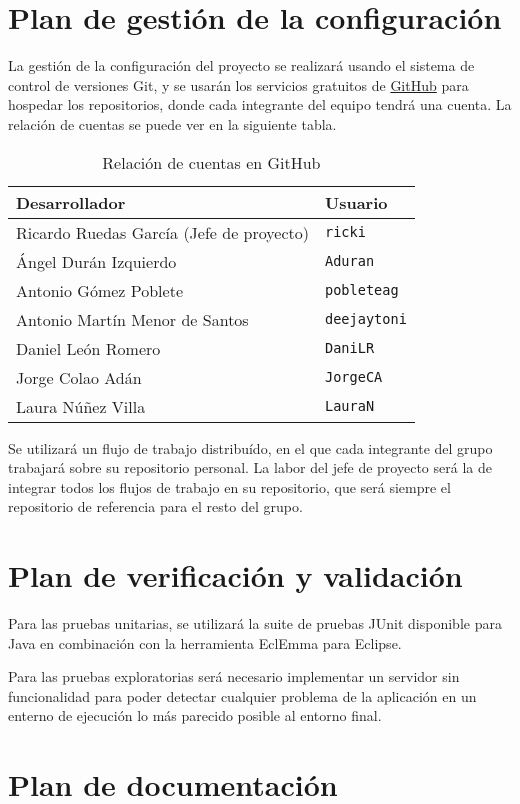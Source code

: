 \section{Plan de gestión de la configuración}

La gestión de la configuración del proyecto se realizará usando el
sistema de control de versiones Git, y se usarán los servicios gratuitos de
\href{http://github.com}{GitHub} para hospedar los repositorios, donde cada
integrante del equipo tendrá una cuenta. La relación de cuentas se puede ver en
la siguiente tabla.

\begin{longtable}[c]{ll}
\caption{Relación de cuentas en GitHub} \\
\textbf{Desarrollador} & \textbf{Usuario} \\
\hline \hline
\endhead
Ricardo Ruedas García (Jefe de proyecto) & \texttt{ricki} \\
\hline
Ángel Durán Izquierdo & \texttt{Aduran} \\
Antonio Gómez Poblete & \texttt{pobleteag} \\
Antonio Martín Menor de Santos & \texttt{deejaytoni} \\
Daniel León Romero & \texttt{DaniLR} \\
Jorge Colao Adán & \texttt{JorgeCA} \\
Laura Núñez Villa & \texttt{LauraN} \\
\hline
\end{longtable}

Se utilizará un flujo de trabajo distribuído, en el que cada integrante del
grupo trabajará sobre su repositorio personal. La labor del jefe de proyecto
será la de integrar todos los flujos de trabajo en su repositorio, que será
siempre el repositorio de referencia para el resto del grupo.

\section{Plan de verificación y validación}

Para las pruebas unitarias, se utilizará la suite de pruebas JUnit disponible
para Java en combinación con la herramienta EclEmma para Eclipse.

Para las pruebas exploratorias será necesario implementar un servidor sin
funcionalidad para poder detectar cualquier problema de la aplicación en un
enterno de ejecución lo más parecido posible al entorno final.

\section{Plan de documentación}

